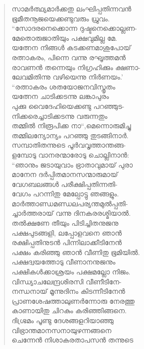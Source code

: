 \begin{verse}
സാമര്‍ത്ഥ്യമാര്‍ക്കതു ലംഘിപ്പതിന്നവന്‍\\
ഭൂമീതനൂജയെക്കണ്ടുവരും ധ്രുവം.\\
“സോദരനെക്കൊന്ന ദുഷ്ടനെക്കൊല്ലണ-\\
മേതൊരുജാതിയും പക്ഷവുമില്ല മേ.\\
യത്നേന നിങ്ങള്‍ കടക്കണമാശുപോയ്\\
രത്നാകരം, പിന്നെ വന്നു രഘൂത്തമന്‍\\
രാവണന്‍ തന്നെയും നിഗ്രഹിക്കും ക്ഷണാ-\\
ലേവമിതിന്നു വഴിയെന്നു നിര്‍ണയം.’\\
“രത്നാകരം ശതയോജനവിസ്തൃതം\\
യത്നേന ചാടിക്കടന്നു ലങ്കാപുരം\\
പുക്കു വൈദേഹിയെക്കണ്ടു പറഞ്ഞുട-\\
നിക്കരെച്ചാടിക്കടന്നു വരുന്നതും\\
തമ്മില്‍ നിരൂപിക്ക നാ“,മെന്നൊരുമിച്ചു\\
തമ്മിലന്യോന്യം പറഞ്ഞു തുടങ്ങിനാര്‍.\\
സമ്പാതിതന്നുടെ പൂര്‍വവൃത്താന്തങ്ങ-\\
ളമ്പോടു വാനരന്മാരോടു ചൊല്ലിനാന്‍:\\
“ഞാനും ജടായുവാം ഭ്രാതാവുമായ് പുരാ\\
മാനേന ദര്‍പ്പിതമാനസന്മാരുമായ്\\
വേഗബലങ്ങള്‍ പരീക്ഷിപ്പതിന്നതി-\\
വേഗം പറന്നിതു മേല്പോട്ടു ഞങ്ങളും.\\
മാര്‍ത്താണ്ഡമണ്ഡലപര്യന്തമുല്‍പ്പതി-\\
ച്ചാര്‍ത്തരായ് വന്നു ദിനകരരശ്മിയാല്‍.\\
തല്‍ക്ഷണേ തീയും പിടിച്ചിതനുജനു\\
പക്ഷപുടങ്ങളി, ലപ്പോളവനെ ഞാന്‍\\
രക്ഷിപ്പതിനുടന്‍ പിന്നിലാക്കീടിനേന്‍\\
പക്ഷം കരിഞ്ഞു ഞാന്‍ വീണിതു ഭൂമിയില്‍.\\
പക്ഷദ്വയത്തോടു വീണാനനുജനും\\
പക്ഷികള്‍ക്കാശ്രയം പക്ഷമല്ലോ നിജം.\\
വിന്ധ്യാചലേന്ദ്രശിരസി വീണീടിനേ-\\
നന്ധനായ് മൂന്നുദിനം കിടന്നീടിനേന്‍\\
പ്രാണശേഷത്താലുണര്‍ന്നോരു നേരത്തു\\
കാണായിതു ചിറകും കരിഞ്ഞിങ്ങനെ.\\
ദിഗ്ഭ്രമം പൂണ്ടു ദേശങ്ങളറിയാഞ്ഞു\\
വിഭ്രാന്തമാനസനായുഴന്നങ്ങനെ\\
ചെന്നേന്‍ നിശാകരതാപസന്‍ തന്നുടെ\\

\end{verse}
